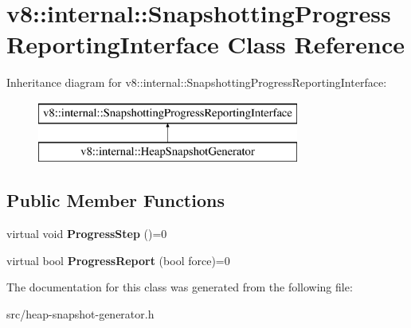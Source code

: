 \hypertarget{classv8_1_1internal_1_1_snapshotting_progress_reporting_interface}{}\section{v8\+:\+:internal\+:\+:Snapshotting\+Progress\+Reporting\+Interface Class Reference}
\label{classv8_1_1internal_1_1_snapshotting_progress_reporting_interface}
Inheritance diagram for v8\+:\+:internal\+:\+:Snapshotting\+Progress\+Reporting\+Interface\+:\begin{figure}[H]
\begin{center}
\leavevmode
\includegraphics[height=2.000000cm]{classv8_1_1internal_1_1_snapshotting_progress_reporting_interface}
\end{center}
\end{figure}
\subsection*{Public Member Functions}
\begin{DoxyCompactItemize}
\item 
\hypertarget{classv8_1_1internal_1_1_snapshotting_progress_reporting_interface_abdd2a80e9a6dbbcfc3f8e510444c7acd}{}virtual void {\bfseries Progress\+Step} ()=0\label{classv8_1_1internal_1_1_snapshotting_progress_reporting_interface_abdd2a80e9a6dbbcfc3f8e510444c7acd}

\item 
\hypertarget{classv8_1_1internal_1_1_snapshotting_progress_reporting_interface_a2b81b8715eac64dfee24b32cc3b1ed48}{}virtual bool {\bfseries Progress\+Report} (bool force)=0\label{classv8_1_1internal_1_1_snapshotting_progress_reporting_interface_a2b81b8715eac64dfee24b32cc3b1ed48}

\end{DoxyCompactItemize}


The documentation for this class was generated from the following file\+:\begin{DoxyCompactItemize}
\item 
src/heap-\/snapshot-\/generator.\+h\end{DoxyCompactItemize}
